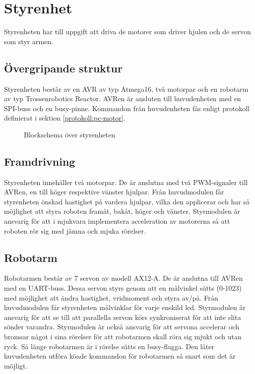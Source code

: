
\section{Styrenhet}

Styrenheten har till uppgift att driva de motorer som driver hjulen och de servon som styr armen.

\subsection{Övergripande struktur}

Styrenheten består av en AVR av typ Atmega16, två motorpar och en robotarm av typ Trossenrobotics Reactor. AVRen är ansluten till huvudenheten med en SPI-buss och en busy-pinne. Kommandon från huvudenheten fås enligt protokoll definierat i sektion \ref{protokoll:pc-motor}.\\

\begin{figure}[h]
\center

\caption{Blockschema över styrenheten}
\end{figure}

\subsection{Framdrivning}

Styrenheten innehåller två motorpar. De är anslutna med två PWM-signaler till AVRen, en till höger respektive vänster hjulpar. Från huvudmodulen får styrenheten önskad hastighet på vardera hjulpar, vilka den applicerar och har så möjlighet att styra roboten framåt, bakåt, höger och vänster. Styrmodulen är ansvarig för att i mjukvara implementera acceleration av motorerna så att roboten rör sig med jämna och mjuka rörelser.

\subsection{Robotarm}

Robotarmen består av 7 servon av modell AX12-A. De är anslutna till AVRen med en UART-buss. Dessa servon styrs genom att en målvinkel sätts (0-1023) med möjlighet att ändra hastighet, vridmoment och styra av/på. Från huvudmodulen får styrenheten målvinklar för varje enskild led. Styrmodulen är ansvarig för att se till att parallella servon körs synkroniserat för att inte slita sönder varandra. Styrmodulen är också ansvarig för att servona accelerar och bromsar något i sina rörelser för att robotarmen skall röra sig mjukt och utan ryck. Så länge robotarmen är i rörelse sätts en busy-flagga. Den låter huvudenheten utföra köade kommandon för robotarmen så snart som det är möjligt. 

